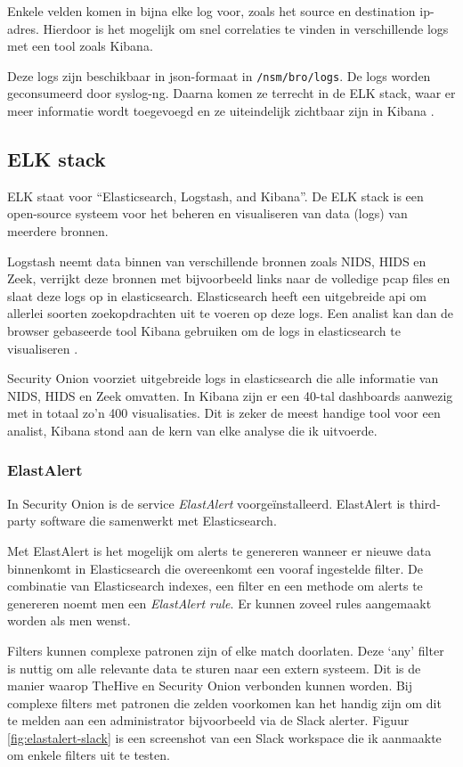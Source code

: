 \documentclass[a4paper, 12pt]{report}
\begin{document}
Enkele velden komen in bijna elke log voor, zoals het source en destination ip-adres.
Hierdoor is het mogelijk om snel correlaties te vinden in verschillende logs met een tool zoals Kibana.

Deze logs zijn beschikbaar in json-formaat in \lstinline|/nsm/bro/logs|.
De logs worden geconsumeerd door syslog-ng.
Daarna komen ze terrecht in de ELK stack, waar er meer informatie wordt toegevoegd en ze uiteindelijk zichtbaar zijn in Kibana \autocite{so:docs}.

\subsection{ELK stack}
ELK staat voor ``Elasticsearch, Logstash, and Kibana''.
De ELK stack is een open-source systeem voor het beheren en visualiseren van data (logs) van meerdere bronnen.

Logstash neemt data binnen van verschillende bronnen zoals NIDS, HIDS en Zeek, verrijkt deze bronnen met bijvoorbeeld links naar de volledige pcap files en slaat deze logs op in elasticsearch.
Elasticsearch heeft een uitgebreide api om allerlei soorten zoekopdrachten uit te voeren op deze logs.
Een analist kan dan de browser gebaseerde tool Kibana gebruiken om de logs in elasticsearch te visualiseren \autocite{elastic:what-is-elk}.

Security Onion voorziet uitgebreide logs in elasticsearch die alle informatie van NIDS, HIDS en Zeek omvatten.
In Kibana zijn er een 40-tal dashboards aanwezig met in totaal zo'n 400 visualisaties.
Dit is zeker de meest handige tool voor een analist, Kibana stond aan de kern van elke analyse die ik uitvoerde.

\subsubsection{ElastAlert}
In Security Onion is de service \emph{ElastAlert} voorgeïnstalleerd.
ElastAlert is third-party software die samenwerkt met Elasticsearch.

Met ElastAlert is het mogelijk om alerts te genereren wanneer er nieuwe data binnenkomt in Elasticsearch die overeenkomt een vooraf ingestelde filter.
De combinatie van Elasticsearch indexes, een filter en een methode om alerts te genereren noemt men een \emph{ElastAlert rule}.
Er kunnen zoveel rules aangemaakt worden als men wenst.

Filters kunnen complexe patronen zijn of elke match doorlaten.
Deze `any' filter is nuttig om alle relevante data te sturen naar een extern systeem.
Dit is de manier waarop TheHive en Security Onion verbonden kunnen worden.
Bij complexe filters met patronen die zelden voorkomen kan het handig zijn om dit te melden aan een administrator bijvoorbeeld via de Slack alerter.
Figuur \ref{fig:elastalert-slack} is een screenshot van een Slack workspace die ik aanmaakte om enkele filters uit te testen.
\end{document}
